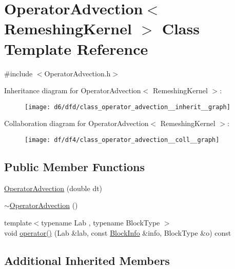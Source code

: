 \hypertarget{class_operator_advection}{}\section{Operator\+Advection$<$ Remeshing\+Kernel $>$ Class Template Reference}
\label{class_operator_advection}


{\ttfamily \#include $<$Operator\+Advection.\+h$>$}



Inheritance diagram for Operator\+Advection$<$ Remeshing\+Kernel $>$\+:\nopagebreak
\begin{figure}[H]
\begin{center}
\leavevmode
\texttt{[image: d6/dfd/class\_operator\_advection\_\_inherit\_\_graph]}
\end{center}
\end{figure}


Collaboration diagram for Operator\+Advection$<$ Remeshing\+Kernel $>$\+:\nopagebreak
\begin{figure}[H]
\begin{center}
\leavevmode
\texttt{[image: df/df4/class\_operator\_advection\_\_coll\_\_graph]}
\end{center}
\end{figure}
\subsection*{Public Member Functions}
\begin{DoxyCompactItemize}
\item 
\hyperlink{class_operator_advection_a174044f2ff03c8d58e44b9d89dfaa4f8}{Operator\+Advection} (double dt)
\item 
\hyperlink{class_operator_advection_a29553dba616cbabc01b4a6f29469c08c}{$\sim$\+Operator\+Advection} ()
\item 
{\footnotesize template$<$typename Lab , typename Block\+Type $>$ }\\void \hyperlink{class_operator_advection_a15dcc82744e11ed8f0a741e0143dbeac}{operator()} (Lab \&lab, const \hyperlink{struct_block_info}{Block\+Info} \&info, Block\+Type \&o) const 
\end{DoxyCompactItemize}
\subsection*{Additional Inherited Members}


